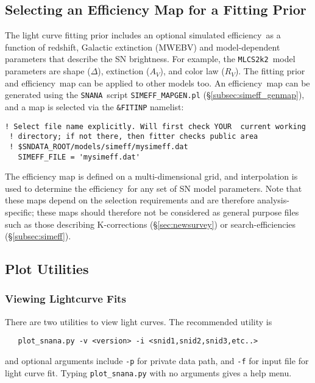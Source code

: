 \documentclass[12pt]{article}
\newcommand{\mlcs}{{\tt MLCS2k2}}
\newcommand{\snana}{{\tt SNANA}}
\newcommand{\eff}{efficiency}
\begin{document}
   \subsection{Selecting an Efficiency Map for a Fitting Prior}
   \label{subsec:prior_eff}

The light curve fitting prior includes an optional 
simulated \eff\ as a function of redshift, 
Galactic extinction (MWEBV) and model-dependent parameters 
that describe the SN brightness.
For example, the \mlcs\ model parameters are shape
($\Delta$), extinction ($A_V$), and color law ($R_V$).
The fitting prior and \eff\ map can be applied to 
other models too.
An \eff\ map can be generated using the \snana\ script
{\tt SIMEFF\_MAPGEN.pl} (\S\ref{subsec:simeff_genmap}),
and a map is selected via the {\tt \&FITINP} namelist: 
%
\begin{Verbatim}[frame=single]
 ! Select file name explicitly. Will first check YOUR  current working 
 ! directory; if not there, then fitter checks public area 
 ! $SNDATA_ROOT/models/simeff/mysimeff.dat
   SIMEFF_FILE = 'mysimeff.dat'
\end{Verbatim}
The efficiency map is defined on a multi-dimensional grid,
and interpolation is used to determine the \eff\ for any 
set of SN  model parameters.  
Note that these maps depend on the selection
requirements and are therefore analysis-specific;
these maps should therefore not be considered as
general purpose files such as those describing
K-corrections (\S\ref{sec:newsurvey}) or
search-efficiencies (\S\ref{subsec:simeff}).


 \clearpage
 \subsection{Plot Utilities}
   \label{subsec:plot_util}

  \subsubsection{Viewing Lightcurve Fits }
   \label{sss:lcplot}

There are two utilities to view light curves. 
The recommended utility is
\begin{verbatim}
   plot_snana.py -v <version> -i <snid1,snid2,snid3,etc..>
\end{verbatim}
and optional arguments include {\tt -p} for private data path,
and {\tt -f} for input file for light curve fit. 
Typing {\tt plot\_snana.py} with no arguments gives a help menu.
\end{document}
